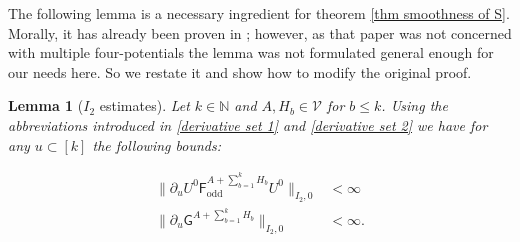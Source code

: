 \documentclass[b5paper,draft,openbib,12pt]{memoir}
\newtheorem{Lemma}[Def]{Lemma}
\DeclareMathOperator{\odd}{odd}
\begin{document}
The following lemma is a necessary ingredient for
theorem \ref{thm smoothness of S}. Morally, it 
has already been proven in 
\cite[Lemma 3.7]{ivp0}; however, as that paper
was not concerned with multiple four-potentials 
the lemma was not formulated general enough 
for our needs here. So we restate it and 
show how to modify the original proof.

\begin{Lemma}[\(I_2\) estimates]\label{F, G off diagonal hilbert schmidt}
Let \(k\in\mathbb{N}\) and 
\(A,H_b\in\mathcal{V}\) for \(b\le k\). 
Using the abbreviations introduced in \eqref{derivative set 1}
and \eqref{derivative set 2}
we have for any \(u\subset [k]\) 
the following bounds:

\begin{align}\label{I2 estimate 1}
\|\partial_u U^0 \mathsf{F}_{\odd}^{A+\sum_{b=1}^k H_b} U^0\|_{I_2,0}&<\infty \\\label{I2 estimate 2}
\|\partial_u \mathsf{G}^{A+\sum_{b=1}^k H_b}\|_{I_2,0}&<\infty.
\end{align}
\end{Lemma}
\end{document}
